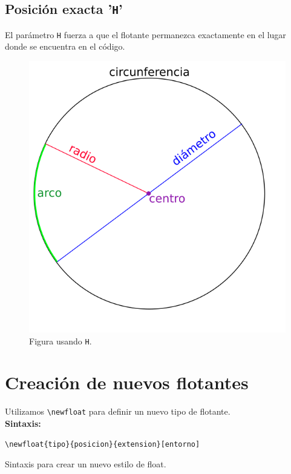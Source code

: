\documentclass{book}
\begin{document}
\subsection*{Posición exacta '\texttt{H}'}
El parámetro \texttt{H} fuerza a que el flotante permanezca exactamente en el lugar donde se encuentra en el código. 

\begin{figure}[H]
    \centering
    \includegraphics[scale=.2,draft]{imagen-ejemplo.png}
    \caption{Figura usando \texttt{H}.}
    \label{fig:H}
\end{figure}

\section{Creación de nuevos flotantes}\label{sec:nuevos_flotantes}
Utilizamos \verb|\newfloat| para definir un nuevo tipo de flotante.\\

\textbf{Sintaxis:}
\begin{codigo}[H]
\centering
\begin{lstlisting}
\newfloat{tipo}{posicion}{extension}[entorno]
\end{lstlisting}
\caption{Sintaxis para crear un nuevo estilo de float.}
\label{sintaxis:newfloat}
\end{codigo}
\end{document}
